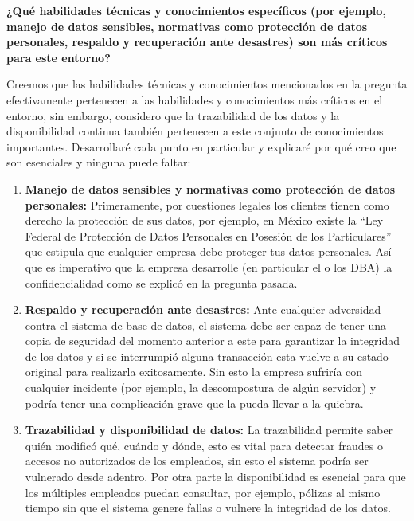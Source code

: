 \textbf{¿Qué habilidades técnicas y conocimientos específicos (por ejemplo, manejo de datos sensibles, normativas como protección de datos personales, respaldo y recuperación ante desastres) son más críticos para este entorno?}

Creemos que las habilidades técnicas y conocimientos mencionados en la pregunta efectivamente pertenecen a las habilidades y conocimientos más críticos en el entorno, sin embargo, considero que la trazabilidad de los datos y la disponibilidad continua también pertenecen a este conjunto de conocimientos importantes. Desarrollaré cada punto en particular y explicaré por qué creo que son esenciales y ninguna puede faltar:

\begin{enumerate}
    \item \textbf{Manejo de datos sensibles y normativas como protección de datos personales:} Primeramente, por cuestiones legales los clientes tienen como derecho la protección de sus datos, por ejemplo, en México existe la ``Ley Federal de Protección de Datos Personales en Posesión de los Particulares''\cite{ley-PDPPP} que estipula que cualquier empresa debe proteger tus datos personales. Así que es imperativo que la empresa desarrolle (en particular el o los DBA) la confidencialidad como se explicó en la pregunta pasada.
    
    \item \textbf{Respaldo y recuperación ante desastres:} Ante cualquier adversidad contra el sistema de base de datos, el sistema debe ser capaz de tener una copia de seguridad del momento anterior a este para garantizar la integridad de los datos y si se interrumpió alguna transacción esta vuelve a su estado original para realizarla exitosamente. Sin esto la empresa sufriría con cualquier incidente (por ejemplo, la descompostura de algún servidor) y podría tener una complicación grave que la pueda llevar a la quiebra.
    
    \item \textbf{Trazabilidad y disponibilidad de datos:} La trazabilidad permite saber quién modificó qué, cuándo y dónde, esto es vital para detectar fraudes o accesos no autorizados de los empleados, sin esto el sistema podría ser vulnerado desde adentro. Por otra parte la disponibilidad es esencial para que los múltiples empleados puedan consultar, por ejemplo, pólizas al mismo tiempo sin que el sistema genere fallas o vulnere la integridad de los datos.
\end{enumerate}

